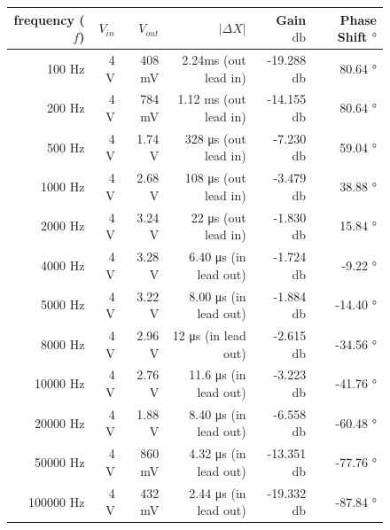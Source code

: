 \documentclass{article}
\begin{document}
\begin{figure}[H]
\centering
\begin{tabular}{ | r | r | r | r | r | r | }
	\hline
	frequency ($f$) & $V_{in}$ & $V_{out}$ & $|\Delta X|$ & Gain $\si{\decibel}$ & Phase Shift $\si{\degree}$ \\ \hline
	100 \si{\hertz} & 4 \si{\volt} & 408 \si{\milli\volt} & 2.24\si{\milli\second} (out lead in) & -19.288 \si{\decibel} & 80.64 \si{\degree}\\ \hline
	200 \si{\hertz} & 4 \si{\volt} & 784 \si{\milli\volt} & 1.12 \si{\milli\second} (out lead in) & -14.155 \si{\decibel} & 80.64 \si{\degree}\\ \hline
	500 \si{\hertz} & 4 \si{\volt} & 1.74 \si{\volt} & 328 \si{\micro\second} (out lead in) & -7.230 \si{\decibel} & 59.04 \si{\degree}\\ \hline
	1000 \si{\hertz} & 4 \si{\volt} & 2.68 \si{\volt} & 108 \si{\micro\second} (out lead in) & -3.479 \si{\decibel} & 38.88 \si{\degree}\\ \hline
	2000 \si{\hertz} & 4 \si{\volt} & 3.24 \si{\volt} & 22 \si{\micro\second} (out lead in) & -1.830 \si{\decibel} & 15.84 \si{\degree}\\ \hline
	4000 \si{\hertz} & 4 \si{\volt} & 3.28 \si{\volt} & 6.40 \si{\micro\second} (in lead out) & -1.724 \si{\decibel} & -9.22 \si{\degree}\\ \hline
	5000 \si{\hertz} & 4 \si{\volt} & 3.22 \si{\volt} & 8.00 \si{\micro\second} (in lead out) & -1.884 \si{\decibel} & -14.40 \si{\degree}\\ \hline
	8000 \si{\hertz} & 4 \si{\volt} & 2.96 \si{\volt} & 12 \si{\micro\second} (in lead out) & -2.615 \si{\decibel} & -34.56 \si{\degree}\\ \hline
	10000 \si{\hertz} & 4 \si{\volt} & 2.76 \si{\volt} & 11.6 \si{\micro\second} (in lead out) & -3.223 \si{\decibel} & -41.76 \si{\degree}\\ \hline
	20000 \si{\hertz} & 4 \si{\volt} & 1.88 \si{\volt} & 8.40 \si{\micro\second} (in lead out) & -6.558 \si{\decibel} & -60.48 \si{\degree}\\ \hline
	50000 \si{\hertz} & 4 \si{\volt} & 860 \si{\milli\volt} & 4.32 \si{\micro\second} (in lead out) & -13.351 \si{\decibel} & -77.76 \si{\degree}\\ \hline
	100000 \si{\hertz} & 4 \si{\volt} & 432 \si{\milli\volt} & 2.44 \si{\micro\second} (in lead out) & -19.332 \si{\decibel} & -87.84 \si{\degree}\\ \hline
\end{tabular}
\end{figure}
\end{document}
